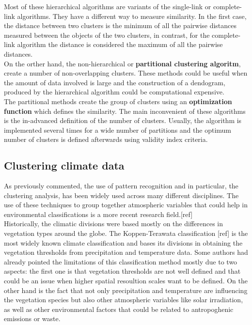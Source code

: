 Most of these hierarchical algorithms are variants of the single-link or complete-link algorithms. They have a different way to measure similarity. In the first case, the distance between two clusters is the minimum of all the pairwise distances measured between the objects of the two clusters, in contrast, for the complete-link algorithm the distance is considered the maximum of all the pairwise distances.\\

On the orther hand, the non-hierarchical or \textbf{partitional clustering algoritm}, create a number of non-overlapping clusters. These methods could be useful when the amount of data involved is large and the construction of a dendogram, produced by the hierarchical algorithm could be computational expensive.\\

The partitional methods create the group of clusters using an \textbf{optimization function} which defines the similarity. The main inconvenient of these algorithms is the in-advanced definition of the number of clusters. Usually, the algorithm is implemented several times for a wide number of partitions and the optimum number of clusters is defined afterwards using validity index criteria.\\



\subsection{Clustering climate data}

As previously commented, the use of pattern recognition and in particular, the clustering analysis, has been widely used across many different disciplines. The use of these techniques to group together atmospheric variables that could help in environmental classifications is a more recent research field.[ref]\\

Historically, the climatic divisions were based mostly on the differences in vegetation types around the globe. The Koppen-Terawata classification [ref] is the most widely known climate classification and bases its divisions in obtaining the vegetation thresholds from precipitation and temperature data. Some authors had already pointed the limitations of this classification method mostly due to two aspects: the first one is that vegetation thresholds are not well defined and that could be an issue when higher spatial resoultion scales want to be defined. On the other hand is the fact that not only precipitation and temperature are influencing the vegetation species but also other atmospheric variables like solar irradiation, as well as other environmental factors that could be related to antropoghenic emissions or waste.\\

